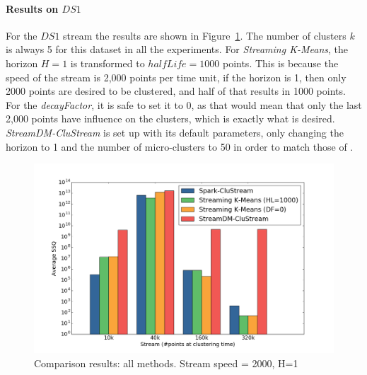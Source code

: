 \paragraph{Results on $DS1$}
For the $DS1$ stream the results are shown in Figure~\ref{fig:comparison2000}. The number of clusters $k$ is always 5 for this dataset in all the experiments.
For \textit{Streaming K-Means}, the horizon $H=1$ is transformed to $halfLife=1000$ points. This is because the speed of the stream is 2,000 points per time unit, if the horizon is 1, then only 2000 points are desired to be clustered, and half of that results in 1000 points. 
For the \textit{decayFactor}, it is safe to set it to 0, as that would mean that only the last 2,000 points have influence on the clusters, which is exactly what is desired.
\textit{StreamDM-CluStream} is set up with its default parameters, only changing the horizon to 1 and the number of micro-clusters to 50 in order to match those of \our.

\begin{figure}[h]
 \centering
 \includegraphics[scale=0.265]{./styles/comparison2000.png}
 \caption{Comparison results: all methods. Stream speed = 2000, H=1}
 \label{fig:comparison2000}
\end{figure}


